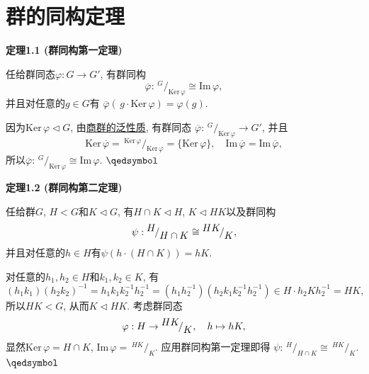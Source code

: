\documentclass[UTF8]{ctexart}
\begin{document}
\setlength{\abovedisplayskip}{1pt}
\setlength{\belowdisplayskip}{1pt}

\section{群的同构定理}

\hypertarget{sec:定理1.1}{}
\noindent\textbf{定理1.1 (群同构第一定理)}

任给群同态$\varphi:G\to G'$, 有群同构
\[
    \overline{\varphi}:\,\!^{\displaystyle G}\!
    /_{\displaystyle\mathrm{Ker}\,\varphi}\cong\mathrm{Im}\,\varphi,
\]
并且对任意的$g\in G$有
$\overline{\varphi}(\,g\cdot\mathrm{Ker}\,\varphi)=\varphi(g)$.


因为$\mathrm{Ker}\,\varphi\lhd G$,
由\href{05 正规子群与商群#nameddest=sec:定理2.1}{商群的泛性质}, 有群同态
$\overline{\varphi}:\,\!^{\displaystyle G}\!
/_{\displaystyle\mathrm{Ker}\,\varphi}\to G'$, 并且
\vspace{3pt}
\[
    \mathrm{Ker}\,\overline{\varphi}=\,\!^{\displaystyle\mathrm{Ker}\,\varphi}\!
    /_{\displaystyle\mathrm{Ker}\,\varphi}=\{\mathrm{Ker}\,\varphi\},\quad
    \mathrm{Im}\,\overline{\varphi}=\mathrm{Im}\,\overline{\varphi},
\]
所以$\overline{\varphi}:\,\!^{\displaystyle G}\!
/_{\displaystyle\mathrm{Ker}\,\varphi}\cong\mathrm{Im}\,\varphi$.
\hfill $\qedsymbol$

\vspace{15pt}

\hypertarget{sec:定理1.2}{}
\noindent\textbf{定理1.2 (群同构第二定理)}

任给群$G$, $H<G$和$K\lhd G$, 有$H\cap K\lhd H$, $K\lhd HK$以及群同构
\vspace{3pt}
\[
    \psi:\,\!^{\displaystyle H}\!/_{\displaystyle H\cap K}
    \cong\,\!^{\displaystyle HK}\!/_{\displaystyle K},\\[3pt]
\]
并且对任意的$h\in H$有$\psi(h\cdot(H\cap K))=hK$.


对任意的$h_1,h_2\in H$和$k_1,k_2\in K$, 有
\[
    (h_1k_1)(h_2k_2)^{-1}=h_1k_1k_2^{-1}h_2^{-1}=
    (h_1h_2^{-1})(h_2k_1k_2^{-1}h_2^{-1})\in H\cdot h_2Kh_2^{-1}=HK,
\]
所以$HK<G$, 从而$K\lhd HK$. 考虑群同态
\[
    \varphi:H\to\,\!^{\displaystyle HK}\!/_{\displaystyle K},
    \quad h\mapsto hK,\\[3pt]
\]
显然$\mathrm{Ker}\,\varphi=H\cap K$, $\mathrm{Im}\,\varphi=
\,\!^{\displaystyle HK}\!/_{\displaystyle K}$. 应用群同构第一定理即得
$\psi:\,\!^{\displaystyle H}\!/_{\displaystyle H\cap K}
\cong\,\!^{\displaystyle HK}\!/_{\displaystyle K}$. \hfill $\qedsymbol$
\end{document}

